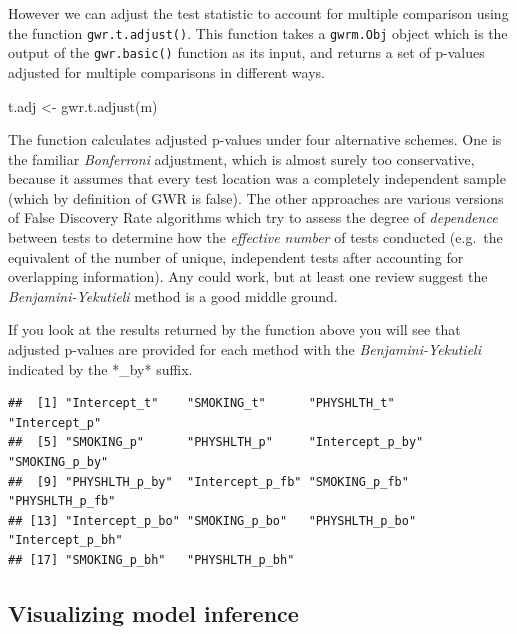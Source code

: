 \documentclass[
]{book}
\newenvironment{Shaded}{\begin{snugshade}}{\end{snugshade}}
\newcommand{\FunctionTok}[1]{\textcolor[rgb]{0.00,0.00,0.00}{#1}}
\newcommand{\NormalTok}[1]{#1}
\newcommand{\OtherTok}[1]{\textcolor[rgb]{0.56,0.35,0.01}{#1}}
\newcommand{\SpecialCharTok}[1]{\textcolor[rgb]{0.00,0.00,0.00}{#1}}
\begin{document}
However we can adjust the test statistic to account for multiple comparison using the function \texttt{gwr.t.adjust()}. This function takes a \texttt{gwrm.Obj} object which is the output of the \texttt{gwr.basic()} function as its input, and returns a set of p-values adjusted for multiple comparisons in different ways.

\begin{Shaded}
\begin{Highlighting}[]
\NormalTok{t.adj }\OtherTok{\textless{}{-}} \FunctionTok{gwr.t.adjust}\NormalTok{(m)}
\end{Highlighting}
\end{Shaded}

The function calculates adjusted p-values under four alternative schemes. One is the familiar \emph{Bonferroni} adjustment, which is almost surely too conservative, because it assumes that every test location was a completely independent sample (which by definition of GWR is false). The other approaches are various versions of False Discovery Rate algorithms which try to assess the degree of \emph{dependence} between tests to determine how the \emph{effective number} of tests conducted (e.g.~the equivalent of the number of unique, independent tests after accounting for overlapping information). Any could work, but at least one review suggest the \emph{Benjamini-Yekutieli} method is a good middle ground.

If you look at the results returned by the function above you will see that adjusted p-values are provided for each method with the \emph{Benjamini-Yekutieli} indicated by the *\_by* suffix.

\begin{Shaded}
\end{Shaded}

\begin{verbatim}
##  [1] "Intercept_t"    "SMOKING_t"      "PHYSHLTH_t"     "Intercept_p"   
##  [5] "SMOKING_p"      "PHYSHLTH_p"     "Intercept_p_by" "SMOKING_p_by"  
##  [9] "PHYSHLTH_p_by"  "Intercept_p_fb" "SMOKING_p_fb"   "PHYSHLTH_p_fb" 
## [13] "Intercept_p_bo" "SMOKING_p_bo"   "PHYSHLTH_p_bo"  "Intercept_p_bh"
## [17] "SMOKING_p_bh"   "PHYSHLTH_p_bh"
\end{verbatim}

\hypertarget{visualizing-model-inference}{%
\subsection{Visualizing model inference}\label{visualizing-model-inference}}
\end{document}
